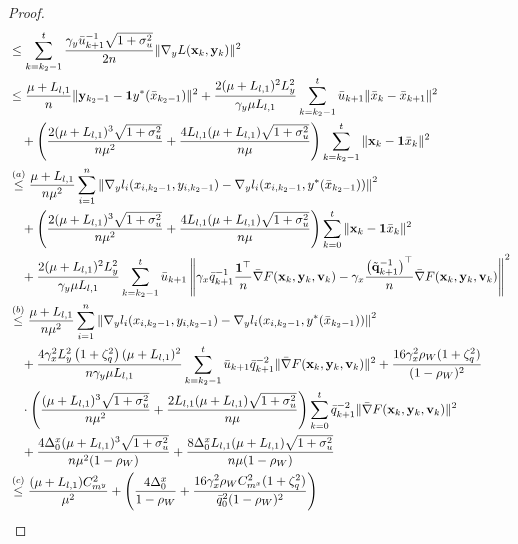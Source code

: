 \documentclass{article}
\theoremstyle{plain}
\theoremstyle{definition}
\theoremstyle{remark}
\begin{document}
\begin{proof}
\begin{align}
&\leq \sum_{k=k_2-1}^t \frac{\gamma_y\bar{u}^{-1}_{k+1}\sqrt{1+\sigma_u^2}}{2n} \|\nabla_y L(\mathbf{x}_k, \mathbf{y}_k)\|^2\nonumber \\
&\leq \frac{\mu + L_{l,1}}{n}\|\mathbf{y}_{k_2-1} - \mathbf{1}y^*(\bar{x}_{k_2-1})\|^2
+ \frac{2(\mu + L_{l,1})^2L_y^2}{\gamma_y \mu L_{l,1}} \sum_{k=k_2-1}^t \bar{u}_{k+1} \|\bar{x}_k - \bar{x}_{k+1}\|^2\nonumber\\
&\quad+\left(\frac{2(\mu+L_{l,1})^3\sqrt{1+\sigma_u^2}}{n\mu^2 }+\frac{4L_{l,1}(\mu+L_{l,1})\sqrt{1+\sigma_u^2}}{n\mu }\right)\sum_{k=k_2-1}^t \|\mathbf{x}_k-\mathbf{1}\bar{x}_k\|^2\nonumber \\
&\overset{(a)}{\leq} \frac{\mu + L_{l,1}}{n\mu^2} \sum_{i=1}^n \left\| \nabla_y l_i(x_{i,k_2-1}, y_{i,k_2-1}) - \nabla_y l_i(x_{i,k_2-1}, y^*(\bar{x}_{k_2-1})) \right\|^2\nonumber\\
&\quad+\left(\frac{2(\mu+L_{l,1})^3\sqrt{1+\sigma_u^2}}{n\mu^2 }+\frac{4L_{l,1}(\mu+L_{l,1})\sqrt{1+\sigma_u^2}}{n\mu }\right)\sum_{k=0}^t \|\mathbf{x}_k-\mathbf{1}\bar{x}_k\|^2 \nonumber\\
&\quad + \frac{2(\mu + L_{l,1})^2 L_y^2}{\gamma_y\mu L_{l,1}} \sum_{k=k_2-1}^t \bar{u}_{k+1} \left\| 
\gamma_x \bar{q}_{k+1}^{-1} \frac{\mathbf{1}^\top}{n} \bar{\nabla} F(\mathbf{x}_k,\mathbf{y}_k,\mathbf{v}_k) 
- \gamma_x \frac{\left(\tilde{\mathbf{q}}_{k+1}^{-1}\right)^\top}{n} \bar{\nabla} F(\mathbf{x}_k,\mathbf{y}_k,\mathbf{v}_k)
\right\|^2\nonumber \\
&\overset{(b)}{\leq} \frac{\mu + L_{l,1}}{n\mu^2} \sum_{i=1}^n \left\| \nabla_y l_i(x_{i,k_2-1}, y_{i,k_2-1}) - \nabla_y l_i(x_{i,k_2-1}, y^*(\bar{x}_{k_2-1})) \right\|^2 \nonumber\\
&\quad + \frac{ 4\gamma_x^2  L_y^2\left( 1 + \zeta_q^2 \right) (\mu + L_{l,1})^2}{n\gamma_y\mu L_{l,1}} \sum_{k=k_2-1}^t \bar{u}_{k+1}
\bar{q}_{k+1}^{-2} \| \bar{\nabla} F(\mathbf{x}_k,\mathbf{y}_k,\mathbf{v}_k)\|^2 + \frac{16 \gamma_x^2 \rho_W (1 + \zeta_q^2)}{(1 - \rho_W)^2}\notag\\
&\quad\cdot\left(\frac{(\mu+L_{l,1})^3\sqrt{1+\sigma_u^2}}{n\mu^2 }+\frac{2L_{l,1}(\mu+L_{l,1})\sqrt{1+\sigma_u^2}}{n\mu }\right)\sum_{k=0}^{t} 
 \bar{q}_{k+1}^{-2} \|\bar{\nabla}F(\mathbf{x}_k, \mathbf{y}_k, \mathbf{v}_k)\|^2\nonumber\\
&\quad + \frac{4\Delta_0^x(\mu+L_{l,1})^3\sqrt{1+\sigma_u^2}}{n\mu^2(1-\rho_W) }+\frac{8\Delta_0^xL_{l,1}(\mu+L_{l,1})\sqrt{1+\sigma_u^2}}{n\mu(1-\rho_W) }\nonumber\\
&\overset{(c)}{\leq} \frac{(\mu + L_{l,1}) C_{m^y}^2}{\mu^2}+\left(\frac{4\Delta_0^x}{1-\rho_W}+\frac{16 \gamma_x^2 \rho_WC_{m^x}^2 (1 + \zeta_q^2)}{\bar{q}_0^2(1 - \rho_W)^2} \right)\notag\\

\end{align}
\end{proof}
\end{document}
